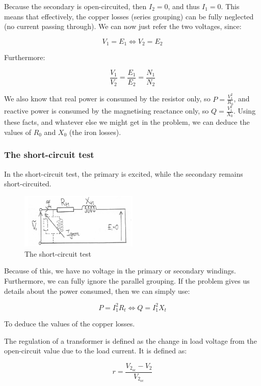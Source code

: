 \documentclass{article}
\begin{document}
Because the secondary is open-circuited, then $I_2 = 0$, and thus $I_1 = 0$. This means that effectively, the copper losses (series grouping) can be fully neglected (no current passing through). We can now just refer the two voltages, since:

\[ V_1 = E_1 \iff V_2 = E_2 \]

Furthermore:

\[ \frac{V_1}{V_2} = \frac{E_1}{E_2} = \frac{N_1}{N_2} \]

We also know that real power is consumed by the resistor only, so $P = \frac{V_1^2}{R_0}$, and reactive power is consumed by the magnetising reactance only, so $Q = \frac{V_1^2}{X_0}$. Using these facts, and whatever else we might get in the problem, we can deduce the values of $R_0$ and $X_0$ (the iron losses).

\subsubsection{The short-circuit test}

In the short-circuit test, the primary is excited, while the secondary remains short-circuited. 

\begin{figure}[h]
    \centering
    \includegraphics[width = 0.5\textwidth]{images/short.png}
    \caption{The short-circuit test}
    \label{fig:enter-label}
\end{figure}

Because of this, we have no voltage in the primary or secondary windings. Furthermore, we can fully ignore the parallel grouping. If the problem gives us details about the power consumed, then we can simply use:

\[ P = I_1^2R_t \iff Q = I_1^2X_t \]

To deduce the values of the copper losses.

\begin{definition}[Regulation]
    The regulation of a transformer is defined as the change in load voltage from the open-circuit value due to the load current. It is defined as:

    \[ r = \frac{V_{2_\text{oc}} - V_2}{V_{2_\text{oc}}} \] 
\end{definition}
\end{document}
